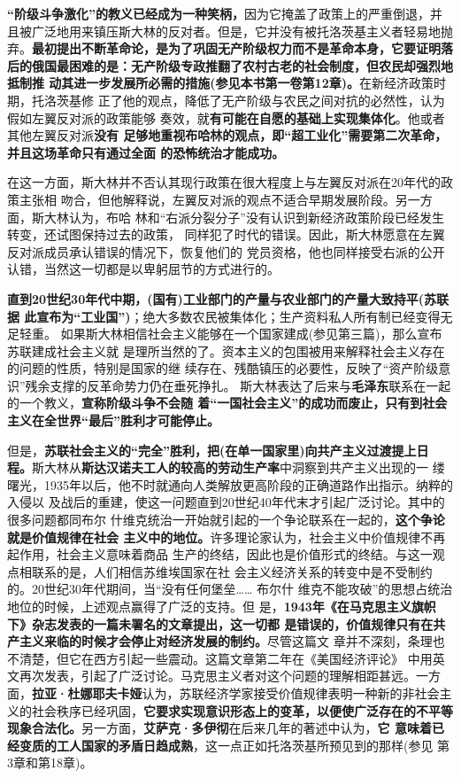 \textbf{“阶级斗争激化”的教义已经成为一种笑柄，}因为它掩盖了政策上的严重倒退，并
且被广泛地用来镇压斯大林的反对者。但是，它并没有被托洛茨基主义者轻易地抛
弃。\textbf{最初提出不断革命论，是为了巩固无产阶级权力而不是革命本身，它要证明落
  后的俄国最困难的是：无产阶级专政推翻了农村古老的社会制度，但农民却强烈地抵制推
  动其进一步发展所必需的措施(参见本书第一卷第12章)。}在新经济政策时期，托洛茨基修
正了他的观点，降低了无产阶级与农民之间对抗的必然性，认为假如左翼反对派的政策能够
奏效，就\textbf{有可能在自愿的基础上实现集体化}。他或者其他左翼反对派\textbf{没有
  足够地重视布哈林的观点，即“超工业化”需要第二次革命，并且这场革命只有通过全面
  的恐怖统治才能成功。}

在这一方面，斯大林并不否认其现行政策在很大程度上与左翼反对派在20年代的政策主张相
吻合，但他解释说，左翼反对派的观点不适合早期发展阶段。另一方面，斯大林认为，布哈
林和“右派分裂分子”没有认识到新经济政策阶段已经发生转变，还试图保持过去的政策，
同样犯了时代的错误。因此，斯大林愿意在左翼反对派成员承认错误的情况下，恢复他们的
党员资格，他也同样接受右派的公开认错，当然这一切都是以卑躬屈节的方式进行的。

\textbf{直到20世纪30年代中期，(国有)工业部门的产量与农业部门的产量大致持平(苏联据
  此宣布为“工业国”)}；绝大多数农民被集体化；生产资料私人所有制已经变得无足轻重。
如果斯大林相信社会主义能够在一个国家建成(参见第三篇)，那么宣布苏联建成社会主义就
是理所当然的了。资本主义的包围被用来解释社会主义存在的问题的性质，特别是国家的继
续存在、残酷镇压的必要性，反映了“资产阶级意识”残余支撑的反革命势力仍在垂死挣扎。
斯大林表达了后来与\textbf{毛泽东}联系在一起的一个教义，\textbf{宣称阶级斗争不会随
  着“一国社会主义”的成功而废止，只有到社会主义在全世界“最后”胜利才可能停止。}

但是，\textbf{苏联社会主义的“完全”胜利，把(在单一国家里)向共产主义过渡提上日
  程。}斯大林从\textbf{斯达汉诺夫工人的较高的劳动生产率}中洞察到共产主义出现的一
缕曙光，1935年以后，他不时就通向人类解放更高阶段的正确道路作出指示。纳粹的入侵以
及战后的重建，使这一问题直到20世纪40年代末才引起广泛讨论。其中的很多问题都同布尔
什维克统治一开始就引起的一个争论联系在一起的，\textbf{这个争论就是价值规律在社会
  主义中的地位。}许多理论家认为，社会主义中价值规律不再起作用，社会主义意味着商品
生产的终结，因此也是价值形式的终结。与这一观点相联系的是，人们相信苏维埃国家在社
会主义经济关系的转变中是不受制约的。20世纪30年代期间，当“没有任何堡垒…… 布尔什
维克不能攻破”的思想占统治地位的时候，上述观点赢得了广泛的支持。但
是，\textbf{1943年《在马克思主义旗帜下》杂志发表的一篇未署名的文章提出，这一切都
  是错误的，价值规律只有在共产主义来临的时候才会停止对经济发展的制约。}尽管这篇文
章并不深刻，条理也不清楚，但它在西方引起一些震动。这篇文章第二年在《美国经济评论》
中用英文再次发表，引起了广泛讨论。马克思主义者对这个问题的理解相距甚远。一方
面，\textbf{拉亚·杜娜耶夫卡娅}认为，苏联经济学家接受价值规律表明一种新的非社会主
义的社会秩序已经巩固，\textbf{它要求实现意识形态上的变革，以便使广泛存在的不平等
  现象合法化。}另一方面，\textbf{艾萨克·多伊彻}在后来几年的著述中认为，\textbf{它
  意味着已经变质的工人国家的矛盾日趋成熟}，这一点正如托洛茨基所预见到的那样(参见
第3章和第18章)。

